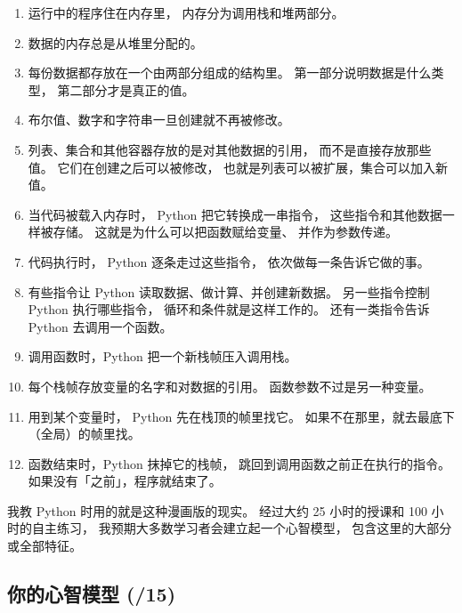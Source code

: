 \begin{enumerate}

\item
  运行中的程序住在内存里，
  内存分为调用栈和堆两部分。

\item
  数据的内存总是从堆里分配的。

\item
  每份数据都存放在一个由两部分组成的结构里。
  第一部分说明数据是什么类型，
  第二部分才是真正的值。

\item
  布尔值、数字和字符串一旦创建就不再被修改。

\item
  列表、集合和其他容器存放的是对其他数据的引用，
  而不是直接存放那些值。
  它们在创建之后可以被修改，
  也就是列表可以被扩展，集合可以加入新值。

\item
  当代码被载入内存时，
  Python 把它转换成一串指令，
  这些指令和其他数据一样被存储。
  这就是为什么可以把函数赋给变量、
  并作为参数传递。

\item
  代码执行时，
  Python 逐条走过这些指令，
  依次做每一条告诉它做的事。

\item
  有些指令让 Python 读取数据、做计算、并创建新数据。
  另一些指令控制 Python 执行哪些指令，
  循环和条件就是这样工作的。
  还有一类指令告诉 Python 去调用一个函数。

\item
  调用函数时，Python 把一个新栈帧压入调用栈。

\item
  每个栈帧存放变量的名字和对数据的引用。
  函数参数不过是另一种变量。

\item
  用到某个变量时，
  Python 先在栈顶的帧里找它。
  如果不在那里，就去最底下（全局）的帧里找。

\item
  函数结束时，Python 抹掉它的栈帧，
  跳回到调用函数之前正在执行的指令。
  如果没有「之前」，程序就结束了。

\end{enumerate}

我教 Python 时用的就是这种漫画版的现实。
经过大约 25 小时的授课和 100 小时的自主练习，
我预期大多数学习者会建立起一个心智模型，
包含这里的大部分或全部特征。


\subsection*{你的心智模型 (/15)}


